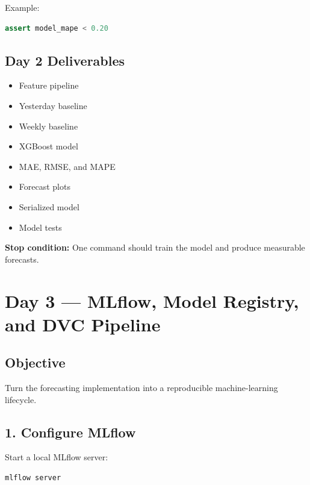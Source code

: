 \documentclass[11pt,a4paper]{article}
\newcommand{\done}{\textbf{\textcolor{codegreen}{✓}}}
\begin{document}
Example:

\begin{lstlisting}[language=Python]
assert model_mape < 0.20
\end{lstlisting}

\subsection{Day 2 Deliverables}

\begin{itemize}
    \item[\done] Feature pipeline
    \item[\done] Yesterday baseline
    \item[\done] Weekly baseline
    \item[\done] XGBoost model
    \item[\done] MAE, RMSE, and MAPE
    \item[\done] Forecast plots
    \item[\done] Serialized model
    \item[\done] Model tests
\end{itemize}

\textbf{Stop condition:} One command should train the model and produce measurable forecasts.

\newpage


\section{Day 3 --- MLflow, Model Registry, and DVC Pipeline}

\subsection{Objective}

Turn the forecasting implementation into a reproducible machine-learning lifecycle.

\subsection{1. Configure MLflow}

Start a local MLflow server:

\begin{lstlisting}[language=bash]
mlflow server
\end{lstlisting}
\end{document}

